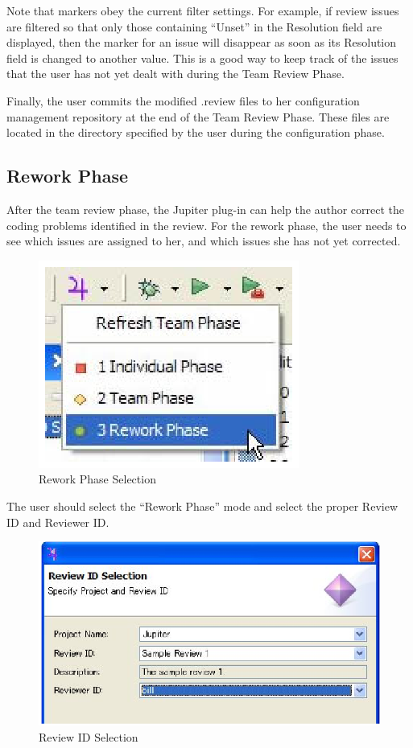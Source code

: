 Note that markers obey the current filter settings. For example, if review issues are filtered so that only those containing ``Unset'' in the Resolution field are displayed, then the marker for an issue will disappear as soon as its Resolution field is changed to another value. This is a good way to keep track of the issues that the user has not yet dealt with during the Team Review Phase.

Finally, the user commits the modified .review files to her configuration management repository at the end of the Team Review Phase. These files are located in the directory specified by the user during the configuration phase.

\subsection{Rework Phase}
\label{subsec:rework-phase}

After the team review phase, the Jupiter plug-in can help the author correct the coding problems identified in the review. For the rework phase, the user needs to see which issues are assigned to her, and which issues she has not yet corrected.

\begin{figure}[htbp]
  \centering
  \includegraphics{images/fig3-33.eps}
  \caption{Rework Phase Selection}
  \label{fig3-33}
\end{figure}

The user should select the ``Rework Phase'' mode and select the proper Review ID and Reviewer ID.

\begin{figure}[htbp]
  \centering
  \includegraphics{images/fig3-34.eps}
  \caption{Review ID Selection}
  \label{fig3-34}
\end{figure}


